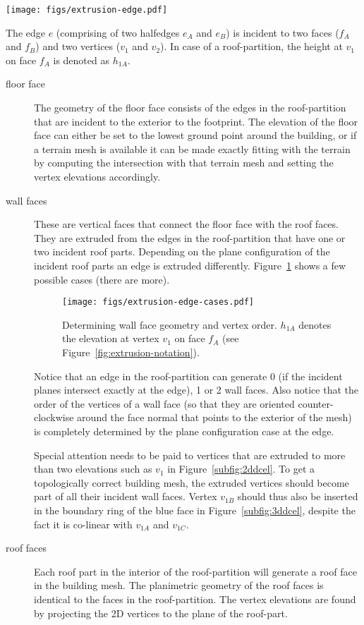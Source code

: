 \begin{marginfigure}
	\centering
	\texttt{[image: figs/extrusion-edge.pdf]}
	\caption[An edge incident to two faces]{The edge $e$ (comprising of two halfedges $e_A$ and $e_B$) is incident to two faces ($f_A$ and $f_B$) and two vertices ($v_1$ and $v_2$). In case of a roof-partition, the height at $v_1$ on face $f_A$ is denoted as $h_{1A}$.}%
	\label{fig:extrusion-notation}
\end{marginfigure}

\begin{description}
\item[floor face] The geometry of the floor face consists of the edges in the roof-partition that are incident to the exterior to the footprint. The elevation of the floor face can either be set to the lowest ground point around the building, or if a terrain mesh is available it can be made exactly fitting with the terrain by computing the intersection with that terrain mesh and setting the vertex elevations accordingly. 

\item[wall faces] These are vertical faces that connect the floor face with the roof faces. They are extruded from the edges in the roof-partition that have one or two incident roof parts. Depending on the plane configuration of the incident roof parts an edge is extruded differently. Figure~\ref{fig:extrusion-cases} shows a few possible cases (there are more).
\begin{figure}
	\texttt{[image: figs/extrusion-edge-cases.pdf]}
	\caption[Determining wall face geometry and vertex order]{Determining wall face geometry and vertex order. $h_{1A}$ denotes the elevation at vertex $v_1$ on face $f_A$ (see Figure~\ref{fig:extrusion-notation}).}%
	\label{fig:extrusion-cases}
\end{figure}
Notice that an edge in the roof-partition can generate 0 (if the incident planes intersect exactly at the edge), 1 or 2 wall faces.
Also notice that the order of the vertices of a wall face (so that they are oriented counter-clockwise around the face normal that points to the exterior of the mesh) is completely determined by the plane configuration case at the edge.

Special attention needs to be paid to vertices that are extruded to more than two elevations such as $v_1$ in Figure~\ref{subfig:2ddcel}.
To get a topologically correct building mesh, the extruded vertices should become part of all their incident wall faces.
Vertex $v_{1B}$ should thus also be inserted in the boundary ring of the blue face in Figure~\ref{subfig:3ddcel}, despite the fact it is co-linear with $v_{1A}$ and $v_{1C}$.

\item[roof faces]  Each roof part in the interior of the roof-partition will generate a roof face in the building mesh. The planimetric geometry of the roof faces is identical to the faces in the roof-partition. The vertex elevations are found by projecting the 2D vertices to the plane of the roof-part.
\end{description}


